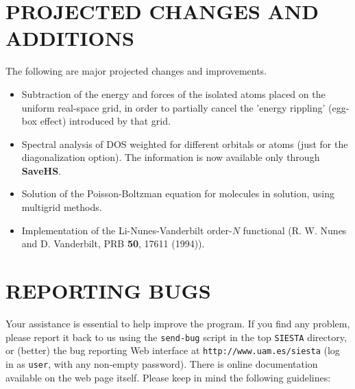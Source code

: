 \documentclass[11pt]{article}
\begin{document}
\section{PROJECTED CHANGES AND ADDITIONS}

The following are major projected changes and improvements.

\begin{itemize}

\item
Subtraction of the energy and forces of the isolated atoms placed
on the uniform real-space grid, in order to partially cancel the
'energy rippling' (egg-box effect) introduced by that grid.

\item
Spectral analysis of DOS weighted for different orbitals or atoms
(just for the diagonalization option). The information is now
available only through {\bf SaveHS}. 

\item
Solution of the Poisson-Boltzman equation for molecules in solution,
using multigrid methods.

\item
Implementation of the Li-Nunes-Vanderbilt order-$N$ functional
(R. W. Nunes and D. Vanderbilt, PRB {\bf 50}, 17611 (1994)).

\end{itemize}


\section{REPORTING BUGS}
Your assistance is essential to help improve the program. If you find
any problem, please report it back to us using the {\tt send-bug}
script in the top {\tt SIESTA} directory, or (better) the bug
reporting Web interface at {\tt http://www.uam.es/siesta} (log in as
{\tt user}, with any non-empty password). There is online
documentation available on the web page itself. Please keep in mind
the following guidelines:
\end{document}
